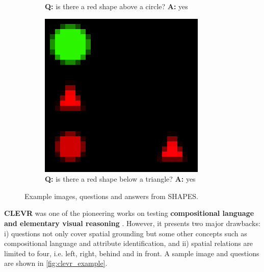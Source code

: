 \begin{figure}[ht]
\begin{subfigure}[b]{0.24\linewidth}
    \caption{\textbf{Q:} is there a red shape above a circle? \textbf{A:} yes}
     \end{subfigure}
     \hfill
     \begin{subfigure}[b]{0.24\linewidth}
     \centering
    \includegraphics[width=\linewidth]{images/datasets/shapes3_big.png}
    \caption{\textbf{Q:} is there a red shape below a triangle? \textbf{A:} yes}
     \end{subfigure}
    \caption{Example images, questions and answers from SHAPES.}
    \label{fig:shapes_examples}
\end{figure}

\textbf{CLEVR} was one of the pioneering works on testing \textbf{compositional language and elementary visual reasoning} \cite{johnson2017clevr}. However, it presents two major drawbacks: i) questions not only cover spatial grounding but some other concepts such as compositional language and attribute identification, and ii) spatial relations are limited to four, i.e. left, right, behind and in front. A sample image and questions are shown in \cref{fig:clevr_example}.

